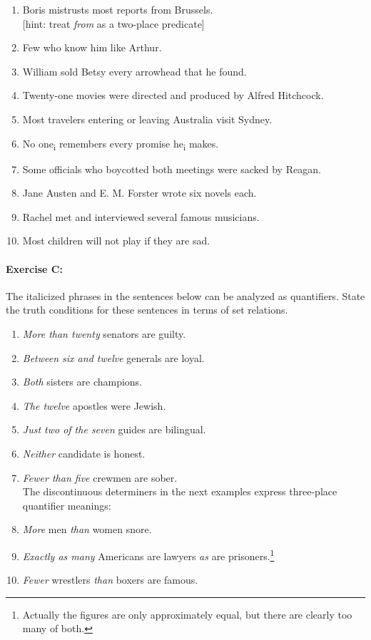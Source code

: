 {\begin{enumerate}
\item Boris mistrusts most reports from Brussels.\\
{}[hint: treat \textit{from} as a two-place predicate]
\item Few who know him like Arthur.
\item William sold Betsy every arrowhead that he found.
\item Twenty-one movies were directed and produced by Alfred Hitchcock.
\item Most travelers entering or leaving Australia visit Sydney.
\item No one\textsubscript{i} remembers every promise he\textsubscript{i} makes.
\item Some officials who boycotted both meetings were sacked by Reagan.
\item Jane Austen and E. M. Forster wrote six novels each.
\item Rachel met and interviewed several famous musicians.
\item Most children will not play if they are sad.
\end{enumerate}

\paragraph*{Exercise C:} The italicized phrases in the sentences below can be analyzed as quantifiers. State the truth conditions for these sentences in terms of set relations. 


\begin{enumerate}
\item \textit{More than twenty}  senators are guilty.   


\item \textit{Between six and twelve} generals are loyal.
\item \textit{Both} sisters are champions.
\item \textit{The twelve} apostles were Jewish.
\item \textit{Just two of the seven} guides are bilingual.
\item \textit{Neither} candidate is honest.
\item \textit{Fewer than five} crewmen are sober. \\

The discontinuous determiners in the next examples express three-place quantifier meanings:

\item \textit{More} men \textit{than} women snore.
\item \textit{Exactly as many} Americans are lawyers \textit{as} are prisoners.\footnote{Actually the figures are only approximately equal, but there are clearly too many of both.} 
\item \textit{Fewer} wrestlers \textit{than} boxers are famous. 
\end{enumerate}
}
